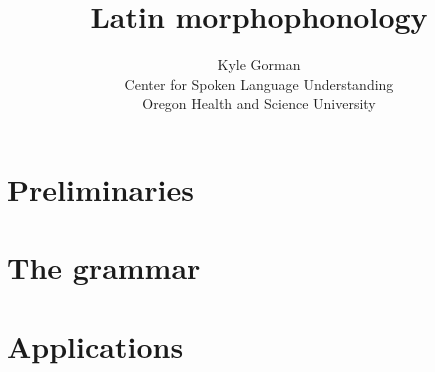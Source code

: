 \documentclass[draft,12pt]{book}
\author{
    Kyle Gorman 
    \\ Center for Spoken Language Understanding 
    \\ Oregon Health and Science University}
\title{Latin morphophonology}
\begin{document}
\frenchspacing
\maketitle
\tableofcontents



\part{Preliminaries}



\part{The grammar}






\part{Applications}





\end{document}
